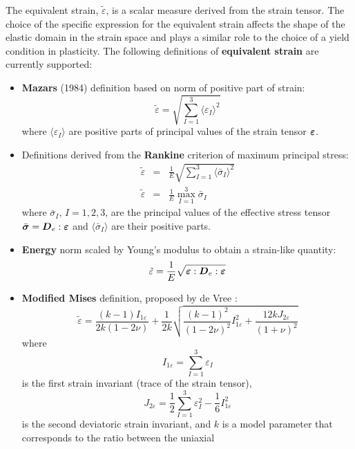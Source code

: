 \documentclass[a4paper]{article}
\newcommand{\mbf}[1]{\mbox{\boldmath$#1$}}
\newcommand{\del}[2]{\mbox{$\displaystyle\frac{#1}{#2}$}}
\begin{document}
The equivalent strain, $\tilde\varepsilon$, is a scalar measure derived from the
strain tensor. The choice of the specific expression
for the equivalent strain affects the shape of the elastic domain
in the strain space and plays a similar role to the choice of a yield
condition in plasticity.
The following definitions of {\bf equivalent strain} are currently supported:
\begin{itemize}
\item {\bf Mazars} (1984) definition based on norm of positive part of strain:
\begin{equation}
\label{mazars}
\tilde\varepsilon=\sqrt{\displaystyle{\sum_{I=1}^{3}}\langle\varepsilon_I\rangle^2}
\end{equation}
where $\langle\varepsilon_I\rangle$ are positive parts of 
principal values of the strain tensor $\mbf{\varepsilon}$.
\item Definitions derived from the {\bf Rankine} criterion of maximum principal stress:
\begin{eqnarray}
\label{rankinesmooth}
\tilde\varepsilon&=&
{\del{1}{E}}\sqrt{\displaystyle{\sum_{I=1}^{3}}\langle\bar{\sigma}_I\rangle^2}
\\
\label{rankinestandard}
\tilde\varepsilon&=&
{\del{1}{E}}\max_{I=1}^{3}\bar{\sigma}_I
\end{eqnarray}
where
$\bar{\sigma}_I$, $I=1,2,3$, are the principal 
values of the
effective stress tensor $\bar{\mbf{\sigma}} = \mbf{D}_e:\mbf{\varepsilon}$
and $\langle\bar{\sigma}_I\rangle$ are their positive parts.
\item {\bf Energy} norm scaled by Young's modulus to obtain
a strain-like quantity:
\begin{equation}
\label{energynorm}
\tilde\varepsilon=\del{1}{E}\sqrt{{\mbf{\varepsilon}:\mbf{D}_e:\mbf{\varepsilon}}}
\end{equation}
\item {\bf Modified Mises} definition, proposed by de Vree \cite{Vree:95}:
\begin{equation}
\label{modifiedmises}
\tilde\varepsilon=\frac{(k-1)I_{1\varepsilon}}{2k(1-2\nu)} + \frac{1}{2k}\sqrt{\frac{(k-1)^2}{(1-2\nu)^2}I_{1\varepsilon}^2+\frac{12 k J_{2\varepsilon}}{(1+\nu)^2}} 
\end{equation}
where $$
I_{1\varepsilon} = \sum_{I=1}^3\varepsilon_I
$$
is the first strain invariant (trace of the strain tensor),
$$
J_{2\varepsilon} = \frac{1}{2}\sum_{I=1}^3 \varepsilon_I^2-\frac{1}{6}I_{1\varepsilon}^2
$$  
is the second deviatoric strain invariant,
and $k$ is a model parameter that corresponds to the ratio between the uniaxial

\end{itemize}
\end{document}
